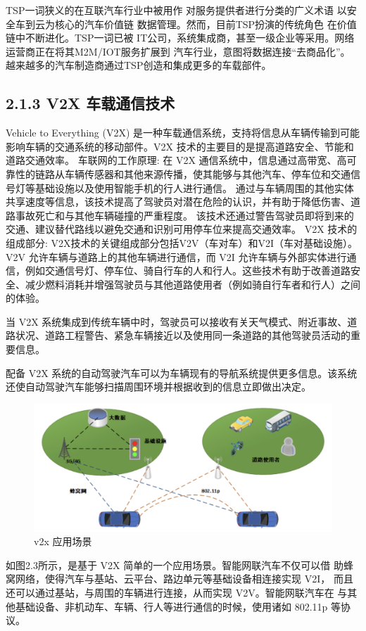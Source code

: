 TSP一词狭义的在互联汽车行业中被用作
对服务提供者进行分类的广义术语
以安全车到云为核心的汽车价值链
数据管理。然而，目前TSP扮演的传统角色
在价值链中不断进化。TSP一词已被
IT公司，系统集成商，甚至一级企业等采用。网络
运营商正在将其M2M/IOT服务扩展到
汽车行业，意图将数据连接“去商品化”。
越来越多的汽车制造商通过TSP创造和集成更多的车载部件。

\subsection*{2.1.3 V2X 车载通信技术}

Vehicle to Everything (V2X) 是一种车载通信系统，支持将信息从车辆传输到可能影响车辆的交通系统的移动部件。V2X 技术的主要目的是提高道路安全、节能和道路交通效率。
\newline
车联网的工作原理: 在 V2X 通信系统中，信息通过高带宽、高可靠性的链路从车辆传感器和其他来源传播，使其能够与其他汽车、停车位和交通信号灯等基础设施以及使用智能手机的行人进行通信。
通过与车辆周围的其他实体共享速度等信息，该技术提高了驾驶员对潜在危险的认识，并有助于降低伤害、道路事故死亡和与其他车辆碰撞的严重程度。
该技术还通过警告驾驶员即将到来的交通、建议替代路线以避免交通和识别可用停车位来提高交通效率。
\newline
V2X 技术的组成部分:
V2X技术的关键组成部分包括V2V（车对车）和V2I（车对基础设施）。V2V 允许车辆与道路上的其他车辆进行通信，而 V2I 允许车辆与外部实体进行通信，例如交通信号灯、停车位、骑自行车的人和行人。这些技术有助于改善道路安全、减少燃料消耗并增强驾驶员与其他道路使用者（例如骑自行车者和行人）之间的体验。

当 V2X 系统集成到传统车辆中时，驾驶员可以接收有关天气模式、附近事故、道路状况、道路工程警告、紧急车辆接近以及使用同一条道路的其他驾驶员活动的重要信息。

配备 V2X 系统的自动驾驶汽车可以为车辆现有的导航系统提供更多信息。该系统还使自动驾驶汽车能够扫描周围环境并根据收到的信息立即做出决定。
\begin{figure}
    \centering
    \includegraphics[scale=0.6]{resources/img/i3.png}
    \caption{v2x 应用场景}
  \end{figure}
\newline
如图2.3所示，是基于 V2X 简单的一个应用场景。智能网联汽车不仅可以借
助蜂窝网络，使得汽车与基站、云平台、路边单元等基础设备相连接实现 V2I，
而且还可以通过基站，与周围的车辆进行连接，从而实现 V2V。智能网联汽车在
与其他基础设备、非机动车、车辆、行人等进行通信的时候，使用诸如 802.11p
等协议。

